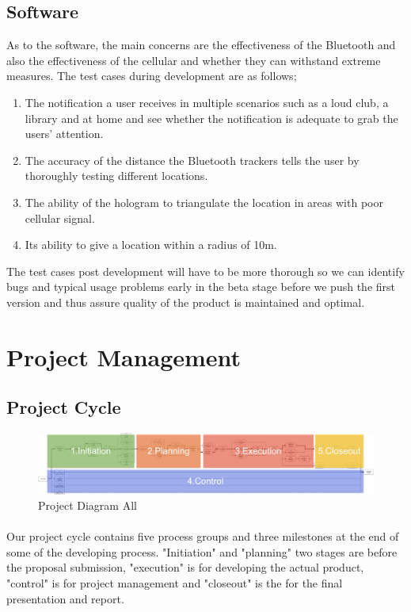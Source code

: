 \documentclass[12pt,a4paper]{article}
\begin{document}
      \subsection{Software}
      As to the software, the main concerns are the effectiveness of the Bluetooth and also the effectiveness of the cellular and whether they can withstand extreme measures. The test cases during development are as follows;
      \begin{enumerate}
        \item The notification a user receives in multiple scenarios such as a loud club, a library and at home and see whether the notification is adequate to grab the users’ attention.
        \item The accuracy of the distance the Bluetooth trackers tells the user by thoroughly testing different locations.
        \item The ability of the hologram to triangulate the location in areas with poor cellular signal.
        \item Its ability to give a location within a radius of 10m.
      \end{enumerate}
      The test cases post development will have to be more thorough so we can identify bugs and typical usage problems early in the beta stage before we push the first version and thus assure quality of the product is maintained and optimal.
          
    \section{Project Management}
      \subsection{Project Cycle}
      \begin{figure}[H]
        \centering
        \includegraphics[width=1\textwidth]{../assets/9-project-diagram-all.jpg}
        \caption{Project Diagram All}
        \label{fig:Project Diagram All}
      \end{figure}
      \paragraph{}
        Our project cycle contains five process groups\cite{pmp} and three milestones at the end of some of the developing process. "Initiation" and "planning" two stages are before the proposal submission, "execution" is for developing the actual product, "control" is for project management and "closeout" is the for the final presentation and report.
      
\end{document}
